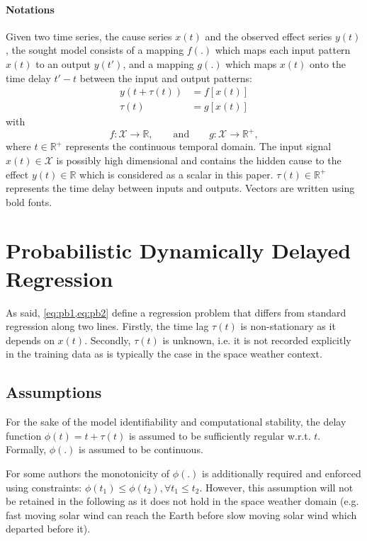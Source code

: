 \paragraph{Notations}
Given two time series, the cause series $x(t)$ and the observed effect series $y(t)$, the sought model 
consists of a mapping $f(.)$ which maps each input pattern $x(t)$ to an output $y(t')$, and a 
mapping $g(.)$ which maps $x(t)$ onto the time delay $t'-t$ between the input and output patterns:
%
\begin{align}
y(t + \tau(t)) & = f[x(t)]\label{eq:pb1}\\
\tau(t) & = g[x(t)]\label{eq:pb2} 
\end{align}
with
\[
f: \mathcal{X}  \rightarrow \mathbb{R},\qquad\text{and}\qquad
g: \mathcal{X}  \rightarrow \mathbb{R}^{+},
\]
where $t \in \mathbb{R}^{+}$ represents the continuous temporal domain. The input signal 
$x(t)\in \mathcal{X}$ is possibly high dimensional and contains the hidden cause to 
the effect $y(t)\in\mathbb{R}$ which is considered as a scalar in this paper. 
$\tau(t)\in \mathbb{R}^+$ represents the time delay between inputs and outputs.
Vectors are written using bold fonts.

\section{Probabilistic Dynamically Delayed Regression}\label{sec:dtlrformulation}
As said, \cref{eq:pb1,eq:pb2} define a regression problem that differs from standard regression 
along two lines. Firstly, the time lag $\tau(t)$ is non-stationary as it depends on $x(t)$.  Secondly, 
$\tau(t)$ is unknown, i.e. it is not recorded explicitly in the training data as is typically the case in 
the space weather context. 

\subsection{Assumptions}

For the sake of the model identifiability and computational stability, the delay function 
$\phi(t) = t + \tau(t)$ is assumed to be sufficiently regular w.r.t. $t$. Formally, $\phi(.)$ is assumed 
to be continuous.

For some authors  \citep{ZHOU2006195} the monotonicity of $\phi(.)$ is additionally required and enforced 
using constraints: $\phi(t_1) \leq \phi(t_2), \forall t_1 \leq t_2$. However, this assumption will not 
be retained in the following as it does not hold in the space weather domain (e.g. fast moving solar wind 
can reach the Earth before slow moving solar wind which departed before it). 

